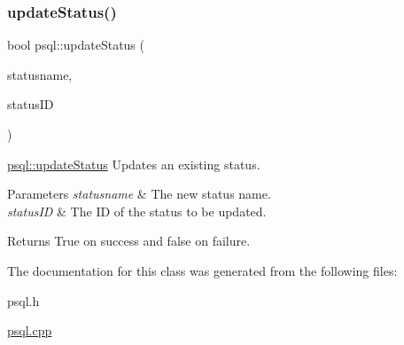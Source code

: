 \subsubsection{\texorpdfstring{update\+Status()}{updateStatus()}}
{\footnotesize\ttfamily bool psql\+::update\+Status (\begin{DoxyParamCaption}\item[{Q\+String}]{statusname,  }\item[{int}]{status\+ID }\end{DoxyParamCaption})}



\mbox{\hyperlink{classpsql_a620364c99c98e20720908deb045536a0}{psql\+::update\+Status}} Updates an existing status. 


\begin{DoxyParams}{Parameters}
{\em statusname} & The new status name. \\
\hline
{\em status\+ID} & The ID of the status to be updated. \\
\hline
\end{DoxyParams}
\begin{DoxyReturn}{Returns}
True on success and false on failure. 
\end{DoxyReturn}


The documentation for this class was generated from the following files\+:\begin{DoxyCompactItemize}
\item 
psql.\+h\item 
\mbox{\hyperlink{psql_8cpp}{psql.\+cpp}}\end{DoxyCompactItemize}
